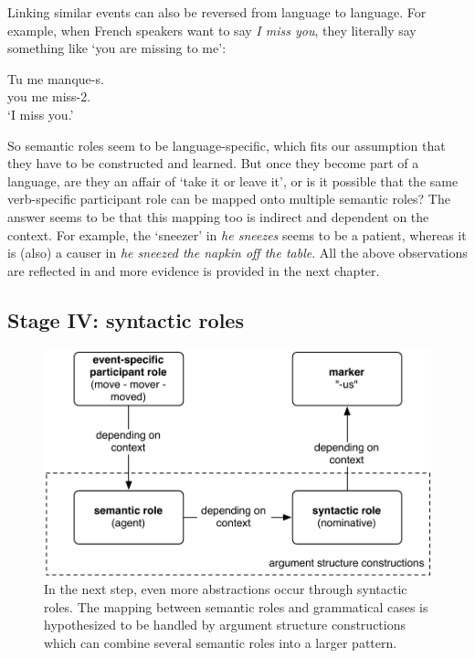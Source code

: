 Linking similar events can also be reversed from language to language. For example, when French speakers want to say {\em I miss you}, they literally say something like `you are missing to me':

\ea
\gll Tu me manque-s. \\
you me miss-2{\sg}.{\prs} \\
\glt `I miss you.' \\
\z


So semantic roles seem to be language-specific, which fits our assumption that they have to be constructed and learned. But once they become part of a language, are they an affair of `take it or leave it', or is it possible that the same verb-specific participant role can be mapped onto multiple semantic roles? The answer seems to be that this mapping too is indirect and dependent on the context. For example, the `sneezer' in {\em he sneezes} seems to be a patient, whereas it is (also) a causer in {\em he sneezed the napkin off the table}. All the above observations are reflected in  and more evidence is provided in the next chapter.

\subsection{Stage IV: syntactic roles}
\label{s:stage4}

\begin{figure}[t]
\centerline{\includegraphics[scale=0.6]{chap-introduction/figs/case-quadrant}}
  \caption[Formation of case markers: stage IV]{In the next step, even more abstractions occur through syntactic roles. The mapping between semantic roles and grammatical cases is hypothesized to be handled by argument structure constructions which can combine several semantic roles into a larger pattern.}
   \label{f:stage4}
\end{figure}

